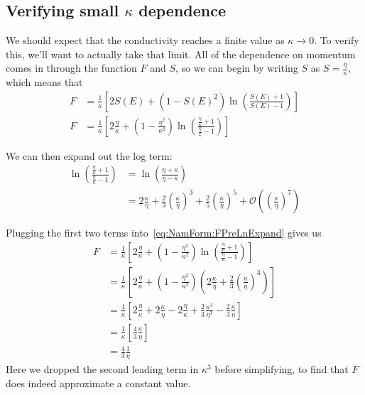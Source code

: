\documentclass[11pt]{article}
\begin{document}
\subsection{Verifying small $\kappa$ dependence} \label{subsec:NamForm.SmallK}
We should expect that the conductivity reaches a finite value as $\kappa \rightarrow 0$.
To verify this, we'll want to actually take that limit.
All of the dependence on momentum comes in through the function $F$ and $S$, so we can begin by writing $S$ as $S = \frac{\eta}{\kappa}$, which means that
\begin{align}
	F &= \frac{1}{\kappa} \left[2 S(E) + (1 - S(E)^2)\ln(\frac{S(E) + 1}{S(E) - 1})\right] \\
	F &= \frac{1}{\kappa} \left[2 \frac{\eta}{\kappa} + (1 - \frac{\eta^2}{\kappa^2})\ln(\frac{\frac{\eta}{\kappa} + 1}{\frac{\eta}{\kappa} - 1})\right] \label{eq:NamForm:FPreLnExpand}
\end{align}

We can then expand out the log term:
\begin{align}
	\ln(\frac{\frac{\eta}{\kappa} + 1}{\frac{\eta}{\kappa} - 1}) &= \ln(\frac{\eta + \kappa}{\eta - \kappa}) \\
	&= 2 \frac{\kappa}{\eta} + \frac23 \left(\frac{\kappa}{\eta}\right)^3 + \frac25 \left(\frac{\kappa}{\eta}\right)^5 + \mathcal{O}\left(\left(\frac{\kappa}{\eta}\right)^7\right)
\end{align}

Plugging the first two terms into~\eqref{eq:NamForm:FPreLnExpand} gives us
\begin{align}
	F &= \frac{1}{\kappa} \left[2 \frac{\eta}{\kappa} + (1 - \frac{\eta^2}{\kappa^2})\ln(\frac{\frac{\eta}{\kappa} + 1}{\frac{\eta}{\kappa} - 1})\right] \\
	&= \frac{1}{\kappa} \left[2 \frac{\eta}{\kappa} + (1 - \frac{\eta^2}{\kappa^2})\left(2 \frac{\kappa}{\eta} + \frac23 \left(\frac{\kappa}{\eta}\right)^3\right)\right] \\
	&= \frac{1}{\kappa} \left[2 \frac{\eta}{\kappa} + 2\frac{\kappa}{\eta} - 2 \frac{\eta}{\kappa} + \frac23 \frac{\kappa^3}{\eta^3} - \frac23 \frac{\kappa}{\eta}\right] \\
	&= \frac{1}{\kappa} \left[\frac43\frac{\kappa}{\eta}\right] \\
	&= \frac43 \frac{1}{\eta}
\end{align}
Here we dropped the second leading term in $\kappa^3$ before simplifying, to find that $F$ does indeed approximate a constant value.
\end{document}

